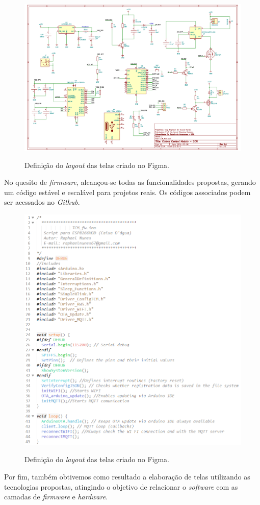 \begin{figure}[H]
	\centering
	\caption{Definição do \textit{layout} das telas criado no Figma.}
	\includegraphics[width=1\textwidth]{figuras/kicad_ccm.png}
	\label{fig:kicad_ccm}
\end{figure}



No quesito de \textit{firmware}, alcançou-se todas as funcionalidades propostas, gerando um código estável e escalável para projetos reais. Os códigos associados podem ser acessados no \textit{Github}.

\begin{figure}[H]
	\centering
	\caption{Definição do \textit{layout} das telas criado no Figma.}
	\includegraphics[width=1\textwidth]{figuras/tcm_main.png}
	\label{fig:tcm_main}
\end{figure}


Por fim, também obtivemos como resultado a elaboração de telas utilizando as tecnologias propostas, atingindo o objetivo de relacionar o \textit{software} com as camadas de \textit{firmware} e \textit{hardware}. 